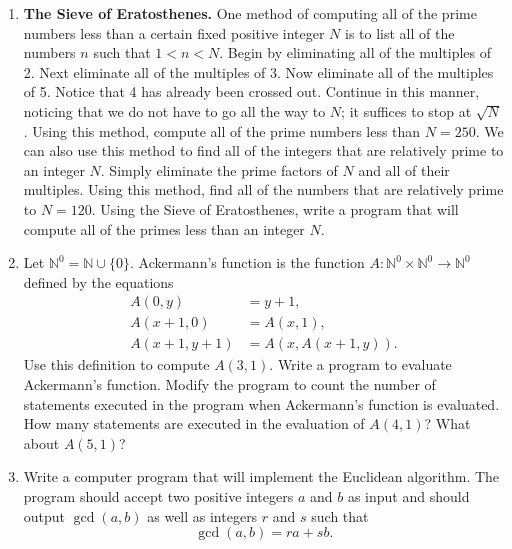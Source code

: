 \documentclass[12pt,reqno]{amsart}
\begin{document}
\begin{enumerate}
 
\item
\textbf{The Sieve of Eratosthenes.}  
One method of computing all of the prime numbers less than a certain fixed positive integer $N$ is to list all of the numbers $n$ such that $1 < n < N$.  Begin by eliminating all of the multiples of 2.  Next eliminate all of the multiples of 3. Now eliminate all of the  multiples of 5.  Notice that 4 has already been crossed out.  Continue in this manner, noticing that we do not have to go all the way to $N$; it suffices to stop at $\sqrt{N}$.  Using this method, compute all of the prime numbers less than $N = 250$.  We can also use this method to find all of the integers that are relatively prime to an integer $N$.  Simply eliminate the prime factors of $N$ and all of their multiples.  Using this method, find all of the numbers that are relatively prime to $N= 120$.  Using the Sieve of Eratosthenes, write a program that will compute all of the primes less than an integer $N$. 

\item
Let ${\mathbb N}^0 = {\mathbb N} \cup \{ 0 \}$. Ackermann's function is the function $A :{\mathbb N}^0 \times {\mathbb N}^0 \rightarrow {\mathbb N}^0$ defined by the equations 
\begin{align*}
A(0, y) & = y + 1, \\
A(x + 1, 0) & = A(x, 1), \\
A(x + 1, y + 1) & = A(x, A(x + 1, y)).
\end{align*}
Use this definition to compute $A(3, 1)$.  Write a program to evaluate Ackermann's function.  Modify the  program to count the number of statements executed in the program when Ackermann's function is evaluated.  How many statements are executed in the evaluation of $A(4, 1)$?  What about $A(5, 1)$?

\item
Write a computer program that will implement the Euclidean algorithm.  The program should accept two positive integers $a$ and $b$ as input and should output $\gcd( a,b)$ as well as integers $r$ and $s$ such that 
\[
\gcd( a,b) = ra + sb.
\]
 

\end{enumerate}
\end{document}
